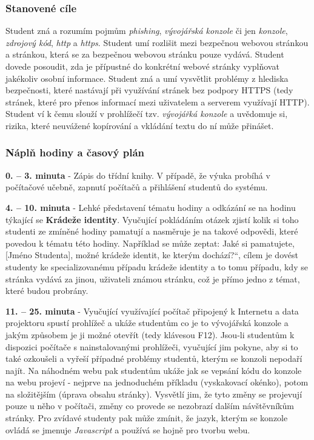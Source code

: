 \documentclass[a4paper, 12pt]{article}
\providecommand{\uv}[1]{\quotedblbase #1\textquotedblleft}
\begin{document}
\subsubsection{Stanovené cíle}
Student zná a rozumím pojmům \textit{phishing}, \textit{vývojářská konzole} či jen \textit{konzole}, \textit{zdrojový kód}, \textit{http} a \textit{https}. Student umí rozlišit mezi bezpečnou webovou stránkou a stránkou, která se za bezpečnou webovou stránku pouze vydává. Student dovede posoudit, zda je přípustné do konkrétní webové stránky vyplňovat jakékoliv osobní informace. Student zná a umí vysvětlit problémy z hlediska bezpečnosti, které nastávají při využívání stránek bez podpory HTTPS (tedy stránek, které pro přenos informací mezi uživatelem a serverem využívají HTTP). Student ví k čemu slouží v prohlížečí tzv. \textit{vývojářká konzole} a uvědomuje si, rizika, které neuvážené kopírování a vkládání textu do ní může přinášet.

\subsubsection{Náplň hodiny a časový plán}
\indent\textbf{0. -- 3. minuta} - Zápis do třídní knihy. V případě, že výuka probíhá v počítačové učebně, zapnutí počítačů a přihlášení studentů do systému.

\textbf{4. -- 10. minuta} - Lehké představení tématu hodiny a odkázání se na hodinu týkající se \textbf{Krádeže identity}. Vyučující pokládáním otázek zjistí kolik si toho studenti ze zmíněné hodiny pamatují a nasměruje je na takové odpovědi, které povedou k tématu této hodiny. Například se může zeptat: \uv{Jaké si pamatujete, [Jméno Studenta], možné krádeže identit, ke kterým dochází?}, cílem je dovést studenty ke specializovanému případu krádeže identity a to tomu případu, kdy se stránka vydává za jinou, uživateli známou stránku, což je přímo jedno z témat, které budou probrány.

\textbf{11. -- 25. minuta} - Vyučující využívající počítač připojený k Internetu a data projektoru spustí prohlížeč a ukáže studentům co je to vývojářská konzole a jakým způsobem je ji možné otevřít (tedy klávesou F12). Jsou-li studentům k dispozici počítače s nainstalovanými prohlížeči, vyučující jim pokyne, aby si to také ozkoušeli a vyřeší případné problémy studentů, kterým se konzoli nepodaří najít. Na náhodném webu pak studentům ukáže jak se vepsání kódu do konzole na webu projeví - nejprve na jednoduchém příkladu (vyskakovací okénko), potom na složitějším (úprava obsahu stránky). Vysvětlí jim, že tyto změny se projevují pouze u něho v počítači, změny co provede se nezobrazí dalším návštěvníkům stránky. Pro zvídavé studenty pak může zmínit, že jazyk, kterým se konzole ovládá se jmenuje \textit{Javascript} a používá se hojně pro tvorbu webu. 
\end{document}
